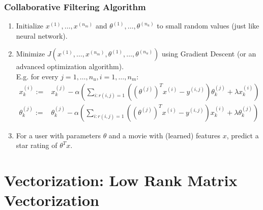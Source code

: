\subsubsection{Collaborative Filtering Algorithm}
\begin{enumerate}
	\item Initialize $x^{(1)}, \dots, x^{(n_m)}$ and $\theta^{(1)}, \dots, \theta^{(n_u)}$
	      to small random values (just like neural network).
	\item Minimize $J(x^{(1)}, \dots, x^{(n_m)}, \theta^{(1)}, \dots, \theta^{(n_u)})$
	      using Gradient Descent (or an advanced optimization algorithm). \\
	      E.g. for every
	      $j = 1, \dots, n_u, i = 1, \dots, n_m$:
	      \begin{align*}
		      x_k^{(i)} :={}      & x_k^{(j)} - \alpha\left(
		      \sum_{i:r(i, j) = 1}\left(
		      \left(\theta^{(j)}\right)^Tx^{(i)} - y^{(i, j)}
		      \right)\theta_k^{(j)} + \lambda x_k^{(i)}
		      \right)                                             \\
		      \theta_k^{(j)} :={} & \theta_k^{(j)} - \alpha\left(
		      \sum_{i:r(i, j) = 1}\left(
		      \left(\theta^{(j)}\right)^Tx^{(i)} - y^{(i, j)}
		      \right)x_k^{(i)} + \lambda\theta_k^{(j)}
		      \right)
	      \end{align*}
	\item For a user with parameters $\theta$ and a movie with (learned) features $x$,
	      predict a star rating of $\theta^Tx$.
\end{enumerate}

\section{Vectorization: Low Rank Matrix Vectorization}
